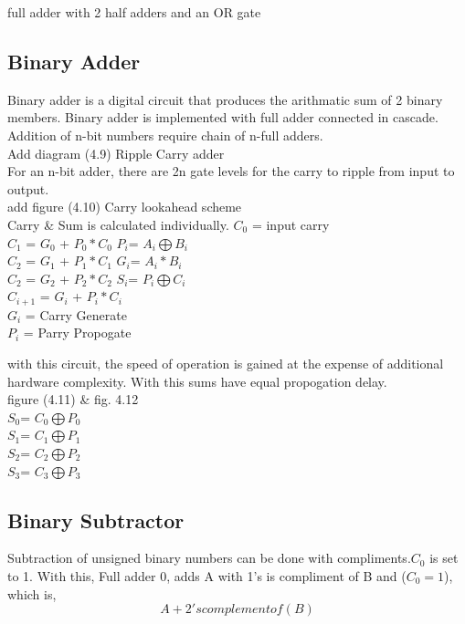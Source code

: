 full adder with 2 half adders and an OR gate 

\subsection{Binary Adder}
Binary adder is a digital circuit that produces the arithmatic sum of 2 binary members. Binary adder is implemented with full adder connected in cascade. Addition of n-bit numbers require chain of n-full adders.\\
Add diagram (4.9) Ripple Carry adder \\
For an n-bit adder, there are 2n gate levels for the carry to ripple from input to output. \\
add figure (4.10) Carry lookahead scheme \\
Carry \& Sum is calculated individually. 
\(C_0\) = input carry\\
\(C_1\) = \(G_0\) + \(P_0*C_0\) \quad \quad \(P_i\)= \(A_i \bigoplus B_i\)\\ 
\(C_2\) = \(G_1\) + \(P_1*C_1\) \quad \quad \(G_i\)= \(A_i*B_i\)\\ 
\(C_2\) = \(G_2\) + \(P_2*C_2\) \quad \quad \(S_i\)= \(P_i \bigoplus C_i\)\\ 
\(C_{i+1}\) = \(G_i\) + \(P_i*C_i\)\\ 

\(G_i\) = Carry Generate \\
\(P_i\) = Parry Propogate 

\par with this circuit, the speed of operation is gained at the expense of additional hardware complexity. With this sums have equal propogation delay.\\
figure (4.11) \& fig. 4.12\\ 

\(S_0\)= \(C_0 \bigoplus P_0\)\\
\(S_1\)= \(C_1 \bigoplus P_1\)\\
\(S_2\)= \(C_2 \bigoplus P_2\)\\
\(S_3\)= \(C_3 \bigoplus P_3\)

\subsection{Binary Subtractor}
Subtraction of unsigned binary numbers can be done with compliments.\(C_0\) is set to 1. With this, Full adder 0, adds A with 1's is compliment of B and (\(C_0 = 1\)), which is, 
\[ A + 2's complement of (B) \]


